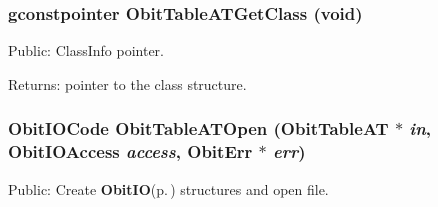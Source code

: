 \subsubsection{\setlength{\rightskip}{0pt plus 5cm}gconstpointer Obit\-Table\-ATGet\-Class (void)}\label{ObitTableAT_8h_a13}


Public: Class\-Info pointer. 

\begin{Desc}
\item[Returns:]pointer to the class structure. \end{Desc}
\subsubsection{\setlength{\rightskip}{0pt plus 5cm}Obit\-IOCode Obit\-Table\-ATOpen ({\bf Obit\-Table\-AT} $\ast$ {\em in}, Obit\-IOAccess {\em access}, {\bf Obit\-Err} $\ast$ {\em err})}\label{ObitTableAT_8h_a17}


Public: Create {\bf Obit\-IO}{\rm (p.\,\pageref{structObitIO})} structures and open file. 

